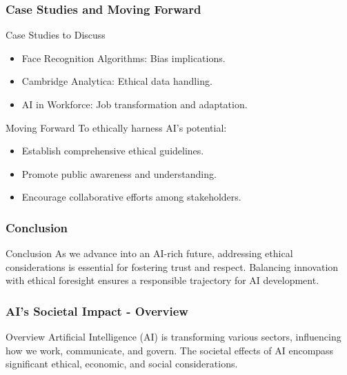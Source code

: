 \documentclass{beamer}
\begin{document}
\begin{frame}[fragile]
    \frametitle{Case Studies and Moving Forward}
    \begin{block}{Case Studies to Discuss}
        \begin{itemize}
            \item Face Recognition Algorithms: Bias implications.
            \item Cambridge Analytica: Ethical data handling.
            \item AI in Workforce: Job transformation and adaptation.
        \end{itemize}
    \end{block}

    \begin{block}{Moving Forward}
        To ethically harness AI's potential:
        \begin{itemize}
            \item Establish comprehensive ethical guidelines.
            \item Promote public awareness and understanding.
            \item Encourage collaborative efforts among stakeholders.
        \end{itemize}
    \end{block}
\end{frame}

\begin{frame}[fragile]
    \frametitle{Conclusion}
    \begin{block}{Conclusion}
        As we advance into an AI-rich future, addressing ethical considerations is essential for fostering trust and respect. Balancing innovation with ethical foresight ensures a responsible trajectory for AI development.
    \end{block}
\end{frame}

\begin{frame}[fragile]
    \frametitle{AI's Societal Impact - Overview}
    \begin{block}{Overview}
        Artificial Intelligence (AI) is transforming various sectors, influencing how we work, communicate, and govern. 
        The societal effects of AI encompass significant ethical, economic, and social considerations.
    \end{block}
\end{frame}
\end{document}
